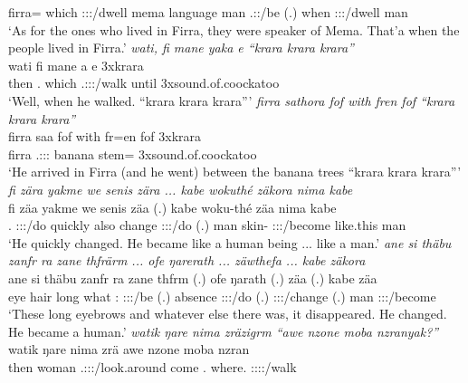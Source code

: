 \begin{exe}
	firra={\Loc} which \Stpl:\Sbj:\Pst:\Dur/dwell mema language man \Tsg.\Masc:\Pst:\Ipfv/be (.) when \Stpl:\Sbj:\Pst:\Dur/dwell man\\
	\trans `As for the ones who lived in Firra, they were speaker of Mema. That'a when the people lived in Firra.'
	\emph{wati, fi mane yaka e ``krara krara krara''}\\
	\gll wati fi mane a e 3x{krara}\\
	then \Third.{\Abs} which \Tsg.\Masc:\Sbj:\Pst:\Ipfv/walk until 3x{sound.of.coockatoo}\\
	\trans `Well, when he walked. ``krara krara krara'''
	\emph{firra sathora fof with fren fof ``krara krara krara''}\\
	\gll firra saa fof with fr=en fof 3x{krara}\\
	firra \Tsg.\Masc:\Sbj:\Pst:\Pfv{} {\Emph} banana stem={\Loc} {\Emph} 3x{sound.of.coockatoo}\\
	\trans `He arrived in Firra (and he went) between the banana trees ``krara krara krara'''
	\emph{fi zära yakme we senis zära ... kabe wokuthé zäkora nima kabe}\\
	\gll fi zäa yakme we senis zäa (.) kabe woku-thé zäa nima kabe\\
	\Third.{\Abs} \Stsg:\Sbj:\Pst:\Pfv/do quickly also change \Stsg:\Sbj:\Pst:\Pfv/do (.) man skin-{\Adlzr} \Stsg:\Sbj:\Pst:\Pfv/become {like.this} man\\
	\trans `He quickly changed. He became like a human being ... like a man.'
	\emph{ane si thäbu zanfr ra zane thfrärm ... ofe ŋarerath ... zäwthefa ... kabe zäkora}\\
	\gll ane si thäbu zanfr ra zane thfrm (.) ofe ŋarath (.) zäa (.) kabe zäa\\
	{\Dem} eye hair long what \Dem:{\Prox} \Stpl:\Sbj:\Pst:\Dur/be (.) absence \Stpl:\Sbj:\Pst:\Ipfv/do (.) \Stsg:\Sbj:\Pst:\Pfv/change (.) man \Stsg:\Sbj:\Pst:\Pfv/become\\
	\trans `These long eyebrows and whatever else there was, it disappeared. He changed. He became a human.'
\largerpage	
{}
	\emph{watik ŋare nima zräzigrm ``awe nzone moba nzranyak?''}\\
	\gll watik ŋare nima zrä awe nzone moba nzran\\
	then woman {\Quot} \Tsg.\F:\Sbj:\Irr:\Pfv/look.around come \Fsg.{\Poss} where.{\Abl} \Ssg:\Sbj:\Irr:\Ipfv:\Venit/walk\\\

\end{exe}
